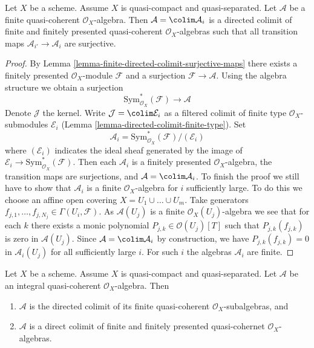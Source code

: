 \begin{lemma}
\label{lemma-finite-algebra-directed-colimit-finite-finitely-presented}
Let $X$ be a scheme. Assume $X$ is quasi-compact and quasi-separated.
Let $\mathcal{A}$ be a finite quasi-coherent $\mathcal{O}_X$-algebra.
Then $\mathcal{A} = \colim \mathcal{A}_i$ is a directed colimit of finite
and finitely presented quasi-coherent $\mathcal{O}_X$-algebras
such that all transition maps $\mathcal{A}_{i'} \to \mathcal{A}_i$
are surjective.
\end{lemma}

\begin{proof}
By Lemma \ref{lemma-finite-directed-colimit-surjective-maps}
there exists a finitely presented $\mathcal{O}_X$-module
$\mathcal{F}$ and a surjection $\mathcal{F} \to \mathcal{A}$.
Using the algebra structure we obtain a surjection
$$
\text{Sym}^*_{\mathcal{O}_X}(\mathcal{F}) \longrightarrow \mathcal{A}
$$
Denote $\mathcal{J}$ the kernel. Write $\mathcal{J} = \colim \mathcal{E}_i$
as a filtered colimit of finite type $\mathcal{O}_X$-submodules
$\mathcal{E}_i$ (Lemma \ref{lemma-directed-colimit-finite-type}). Set
$$
\mathcal{A}_i = \text{Sym}^*_{\mathcal{O}_X}(\mathcal{F})/(\mathcal{E}_i)
$$
where $(\mathcal{E}_i)$ indicates the ideal sheaf generated by
the image of $\mathcal{E}_i \to \text{Sym}^*_{\mathcal{O}_X}(\mathcal{F})$.
Then each $\mathcal{A}_i$ is a finitely presented $\mathcal{O}_X$-algebra,
the transition maps are surjections,
and $\mathcal{A} = \colim \mathcal{A}_i$. To finish the proof we still
have to show that $\mathcal{A}_i$ is a finite $\mathcal{O}_X$-algebra
for $i$ sufficiently large. To do this we choose an affine open
covering $X = U_1 \cup \ldots \cup U_m$. Take generators
$f_{j, 1}, \ldots, f_{j, N_j} \in \Gamma(U_i, \mathcal{F})$.
As $\mathcal{A}(U_j)$ is a finite $\mathcal{O}_X(U_j)$-algebra we
see that for each $k$ there exists a monic polynomial
$P_{j, k} \in \mathcal{O}(U_j)[T]$ such that $P_{j, k}(f_{j, k})$
is zero in $\mathcal{A}(U_j)$. Since
$\mathcal{A} = \colim \mathcal{A}_i$ by construction, we
have $P_{j, k}(f_{j, k}) = 0$ in $\mathcal{A}_i(U_j)$
for all sufficiently large $i$. For such $i$ the algebras
$\mathcal{A}_i$ are finite.
\end{proof}

\begin{lemma}
\label{lemma-integral-algebra-directed-colimit-finite}
Let $X$ be a scheme. Assume $X$ is quasi-compact and quasi-separated.
Let $\mathcal{A}$ be an integral quasi-coherent $\mathcal{O}_X$-algebra.
Then
\begin{enumerate}
\item $\mathcal{A}$ is the directed colimit of its finite
quasi-coherent $\mathcal{O}_X$-subalgebras, and
\item $\mathcal{A}$ is a direct colimit of finite and finitely
presented quasi-cohernet $\mathcal{O}_X$-algebras.
\end{enumerate}
\end{lemma}

